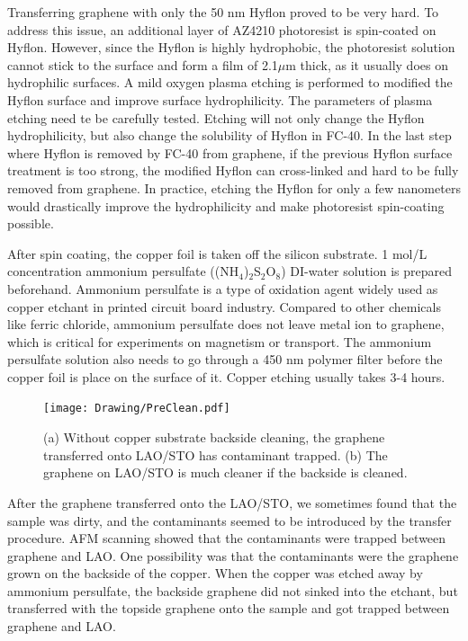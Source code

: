 \documentclass[pdflatex, sectionletters, 12pt]{pittetd}    %
\begin{document}
Transferring graphene with only the 50 nm Hyflon proved to be very hard. To address this issue, an additional layer of AZ4210 photoresist is spin-coated on Hyflon. However, since the Hyflon is highly hydrophobic, the photoresist solution cannot stick to the surface and form a film of 2.1$\mu$m thick, as it usually does on hydrophilic surfaces. A mild oxygen plasma etching is performed to modified the Hyflon surface and improve surface hydrophilicity. The parameters of plasma etching need te be carefully tested. Etching will not only change the Hyflon hydrophilicity, but also change the solubility of Hyflon in FC-40. In the last step where Hyflon is removed by FC-40 from graphene, if the previous Hyflon surface treatment is too strong, the modified Hyflon can cross-linked and hard to be fully removed from graphene. In practice, etching the Hyflon for only a few nanometers would drastically improve the hydrophilicity and make photoresist spin-coating possible.

After spin coating, the copper foil is taken off the silicon substrate. 1 mol/L concentration ammonium persulfate ((NH$_4$)$_2$S$_2$O$_8$) DI-water solution is prepared beforehand. Ammonium persulfate is a type of oxidation agent widely used as copper etchant in printed circuit board industry. Compared to other chemicals like ferric chloride, ammonium persulfate does not leave metal ion to graphene, which is critical for experiments on magnetism or transport. The ammonium persulfate solution also needs to go through a 450 nm polymer filter before the copper foil is place on the surface of it. Copper etching usually takes 3-4 hours. 

\begin{figure}[h!]
	\centering
	\texttt{[image: Drawing/PreClean.pdf]}
	\caption{(a) Without copper substrate backside cleaning, the graphene transferred onto LAO/STO has contaminant trapped. (b) The graphene on LAO/STO is much cleaner if the backside is cleaned.}
	\label{FIG:PreClean}
\end{figure}

After the graphene transferred onto the LAO/STO, we sometimes found that the sample was dirty, and the contaminants seemed to be introduced by the transfer procedure. AFM scanning showed that the contaminants were trapped between graphene and LAO. One possibility was that the contaminants were the graphene grown on the backside of the copper. When the copper was etched away by ammonium persulfate, the backside graphene did not sinked into the etchant, but transferred with the topside graphene onto the sample and got trapped between graphene and LAO. 
\end{document}
